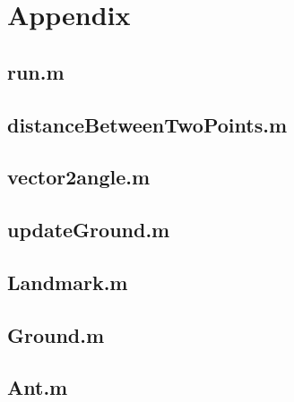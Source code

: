 \documentclass[11pt]{article}
\begin{document}
\newpage
\appendix
\section{Appendix}






\subsection{run.m} \label{run}


\subsection{distanceBetweenTwoPoints.m}\label{distancebetweenTwoPoints}

\subsection{vector2angle.m}\label{vector2angle}

\subsection{updateGround.m}\label{updateGround}

\subsection{Landmark.m}\label{Landmark}

\subsection{Ground.m}\label{Ground}

\subsection{Ant.m}\label{Ant}

\end{document}
